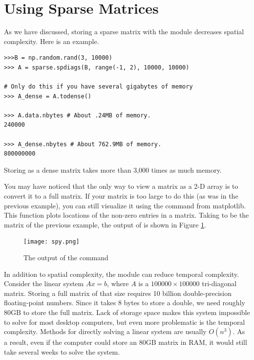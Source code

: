 \section*{Using Sparse Matrices}
As we have discussed, storing a sparse matrix with the  module decreases spatial complexity. Here is an example.

\begin{lstlisting}
>>>B = np.random.rand(3, 10000)
>>> A = sparse.spdiags(B, range(-1, 2), 10000, 10000)

# Only do this if you have several gigabytes of memory
>>> A_dense = A.todense() 

>>> A.data.nbytes # About .24MB of memory.
240000

>>> A_dense.nbytes # About 762.9MB of memory.
800000000

\end{lstlisting}
Storing  as a dense matrix takes more than 3,000 times as much memory. 

You may have noticed that the only way to view a matrix as a 2-D array is to convert it to a full matrix. If your matrix is too large to do this (as was  in the previous example),
you can still visualize it using the  command from matplotlib. This function plots
locations of the non-zero entries in a matrix.
Taking  to be the matrix of the previous example, the output of  is shown in Figure \ref{fig:mpl_spy}.

\begin{figure}[ht]
\centering
\texttt{[image: spy.png]}
\caption{The output of the  command}
\label{fig:mpl_spy}
\end{figure}




In addition to spatial complexity, the  module can reduce temporal complexity. Consider the linear system $A x = b$, where $A$ is a $100000\times 100000$ tri-diagonal matrix.
Storing a full matrix of that size requires 10 billion double-precision floating-point numbers.  Since it takes 8 bytes to store a double, we need roughly 80GB to store the full matrix.  Lack of storage space makes this system impossible to solve for most desktop computers, but even more problematic is the temporal complexity.
Methods for directly solving a linear system are usually $O(n^3)$. As a result, even if the computer could store an 80GB matrix in RAM, it would still take several weeks to solve the system. 

